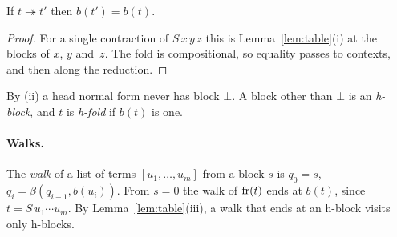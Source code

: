 \begin{lemma}[invariance]\label{lem:inv}
If $t\twoheadrightarrow t'$ then $b(t')=b(t)$.
\end{lemma}
\begin{proof}
For a single contraction of $S\,x\,y\,z$ this is Lemma~\ref{lem:table}(i) at the
blocks of $x$, $y$ and~$z$. The fold is compositional, so equality passes to contexts, and then
along the reduction.
\end{proof}

By (ii) a head normal form never has block $\bot$. A block other than $\bot$ is an
\emph{h-block}, and $t$ is \emph{h-fold} if $b(t)$ is one.

\paragraph{Walks.} The \emph{walk} of a list of terms $[u_1,\dots,u_m]$ from a block $s$
is $q_0=s$, $q_i=\beta(q_{i-1},b(u_i))$. From $s=0$ the walk of $\operatorname{fr}(t)$ ends at
$b(t)$, since $t=S\,u_1\cdots u_m$. By Lemma~\ref{lem:table}(iii), a walk that ends at an
h-block visits only h-blocks.
